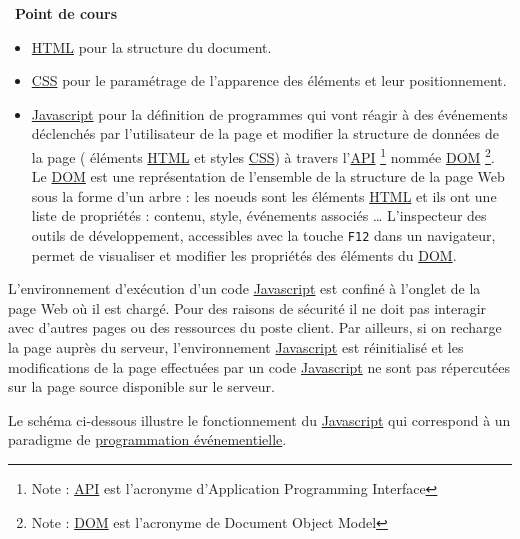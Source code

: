 \documentclass[
  11pt,
]{article}
\newcommand{\passthrough}[1]{#1}
\providecommand{\tightlist}{%
  \setlength{\itemsep}{0pt}\setlength{\parskip}{0pt}}
\newcounter{prop}
\newcounter{cours}
\newenvironment{cours}[1]
{\par \medskip   \addtocounter{cours}{1} \noindent  
\begin{bclogo}[arrondi =0.1,  ombre = true, barre=none, logo=\bcbook, marge=4]{~\textbf{Point de cours} \textbf{\thecours} {\itshape #1} }  \par}
{
\end{bclogo}
 \par \bigskip }
\newcounter{prog}
\begin{document}
\begin{cours}{}
\begin{itemize}
\tightlist
\item
  \href{https://developer.mozilla.org/fr/docs/Glossaire/HTML}{HTML} pour
  la structure du document.
\item
  \href{https://developer.mozilla.org/fr/docs/Glossaire/CSS}{CSS} pour
  le paramétrage de l'apparence des éléments et leur positionnement.
\item
  \href{https://developer.mozilla.org/fr/docs/Glossaire/JavaScript}{Javascript}
  pour la définition de programmes qui vont réagir à des événements
  déclenchés par l'utilisateur de la page et modifier la structure de
  données de la page ( éléments
  \href{https://developer.mozilla.org/fr/docs/Glossaire/HTML}{HTML} et
  styles
  \href{https://developer.mozilla.org/fr/docs/Glossaire/CSS}{CSS}) à
  travers
  l'\href{https://developer.mozilla.org/fr/docs/Glossaire/API}{API}
  \footnote{Note :
    \href{https://developer.mozilla.org/fr/docs/Glossaire/API}{API} est
    l'acronyme d'Application Programming Interface} nommée
  \href{https://developer.mozilla.org/fr/docs/Glossaire/DOM}{DOM}
  \footnote{Note :
    \href{https://developer.mozilla.org/fr/docs/Glossaire/DOM}{DOM} est
    l'acronyme de Document Object Model}. Le
  \href{https://developer.mozilla.org/fr/docs/Glossaire/DOM}{DOM} est
  une représentation de l'ensemble de la structure de la page Web sous
  la forme d'un arbre : les noeuds sont les éléments
  \href{https://developer.mozilla.org/fr/docs/Glossaire/HTML}{HTML} et
  ils ont une liste de propriétés : contenu, style, événements associés
  \ldots{} L'inspecteur des outils de développement, accessibles avec la
  touche \passthrough{\lstinline!F12!} dans un navigateur, permet de
  visualiser et modifier les propriétés des éléments du
  \href{https://developer.mozilla.org/fr/docs/Glossaire/DOM}{DOM}.
\end{itemize}

L'environnement d'exécution d'un code
\href{https://developer.mozilla.org/fr/docs/Glossaire/JavaScript}{Javascript}
est confiné à l'onglet de la page Web où il est chargé. Pour des raisons
de sécurité il ne doit pas interagir avec d'autres pages ou des
ressources du poste client. Par ailleurs, si on recharge la page auprès
du serveur, l'environnement
\href{https://developer.mozilla.org/fr/docs/Glossaire/JavaScript}{Javascript}
est réinitialisé et les modifications de la page effectuées par un code
\href{https://developer.mozilla.org/fr/docs/Glossaire/JavaScript}{Javascript}
ne sont pas répercutées sur la page source disponible sur le serveur.

Le schéma ci-dessous illustre le fonctionnement du
\href{https://developer.mozilla.org/fr/docs/Glossaire/JavaScript}{Javascript}
qui correspond à un paradigme de
\href{https://fr.wikipedia.org/wiki/Programmation_\%C3\%A9v\%C3\%A9nementielle}{programmation
événementielle}.

\end{cours}
\end{document}
